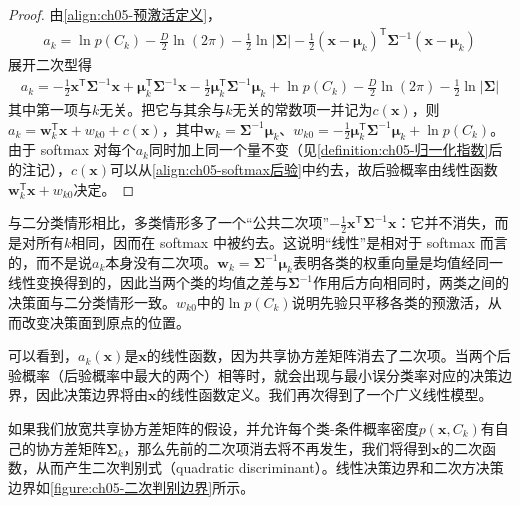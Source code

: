\documentclass[../../main.tex]{subfiles}
\begin{document}
\begin{proof}
由\eqref{align:ch05-预激活定义}，
\begin{align}
  a_k=\ln p(C_k)-\frac{D}{2}\ln(2\pi)-\frac{1}{2}\ln\lvert\boldsymbol{\Sigma}\rvert-\frac{1}{2}(\boldsymbol{x}-\boldsymbol{\mu}_k)^{\mathsf{T}}\boldsymbol{\Sigma}^{-1}(\boldsymbol{x}-\boldsymbol{\mu}_k)
\end{align}
展开二次型得
\begin{align}
  a_k=-\frac{1}{2}\boldsymbol{x}^{\mathsf{T}}\boldsymbol{\Sigma}^{-1}\boldsymbol{x}+\boldsymbol{\mu}_k^{\mathsf{T}}\boldsymbol{\Sigma}^{-1}\boldsymbol{x}-\frac{1}{2}\boldsymbol{\mu}_k^{\mathsf{T}}\boldsymbol{\Sigma}^{-1}\boldsymbol{\mu}_k+\ln p(C_k)-\frac{D}{2}\ln(2\pi)-\frac{1}{2}\ln\lvert\boldsymbol{\Sigma}\rvert
\end{align}
其中第一项与$k$无关。把它与其余与$k$无关的常数项一并记为$c(\boldsymbol{x})$，则$a_k=\boldsymbol{w}_k^{\mathsf{T}}\boldsymbol{x}+w_{k0}+c(\boldsymbol{x})$，其中$\boldsymbol{w}_k=\boldsymbol{\Sigma}^{-1}\boldsymbol{\mu}_k$、$w_{k0}=-\frac{1}{2}\boldsymbol{\mu}_k^{\mathsf{T}}\boldsymbol{\Sigma}^{-1}\boldsymbol{\mu}_k+\ln p(C_k)$。由于 softmax 对每个$a_k$同时加上同一个量不变（见\cref{definition:ch05-归一化指数}后的注记），$c(\boldsymbol{x})$可以从\eqref{align:ch05-softmax后验}中约去，故后验概率由线性函数$\boldsymbol{w}_k^{\mathsf{T}}\boldsymbol{x}+w_{k0}$决定。
\end{proof}

\begin{remark}
与二分类情形相比，多类情形多了一个“公共二次项”$-\frac{1}{2}\boldsymbol{x}^{\mathsf{T}}\boldsymbol{\Sigma}^{-1}\boldsymbol{x}$：它并不消失，而是对所有$k$相同，因而在 softmax 中被约去。这说明“线性”是相对于 softmax 而言的，而不是说$a_k$本身没有二次项。$\boldsymbol{w}_k=\boldsymbol{\Sigma}^{-1}\boldsymbol{\mu}_k$表明各类的权重向量是均值经同一线性变换得到的，因此当两个类的均值之差与$\boldsymbol{\Sigma}^{-1}$作用后方向相同时，两类之间的决策面与二分类情形一致。$w_{k0}$中的$\ln p(C_k)$说明先验只平移各类的预激活，从而改变决策面到原点的位置。
\end{remark}

可以看到，$a_k(\boldsymbol{x})$是$\boldsymbol{x}$的线性函数，因为共享协方差矩阵消去了二次项。当两个后验概率（后验概率中最大的两个）相等时，就会出现与最小误分类率对应的决策边界，因此决策边界将由$\boldsymbol{x}$的线性函数定义。我们再次得到了一个广义线性模型。

如果我们放宽共享协方差矩阵的假设，并允许每个类-条件概率密度$p(\boldsymbol{x},C_k)$有自己的协方差矩阵$\boldsymbol{\Sigma}_k$，那么先前的二次项消去将不再发生，我们将得到$\boldsymbol{x}$的二次函数，从而产生二次判别式（quadratic discriminant）。线性决策边界和二次方决策边界如\cref{figure:ch05-二次判别边界}所示。
\end{document}
